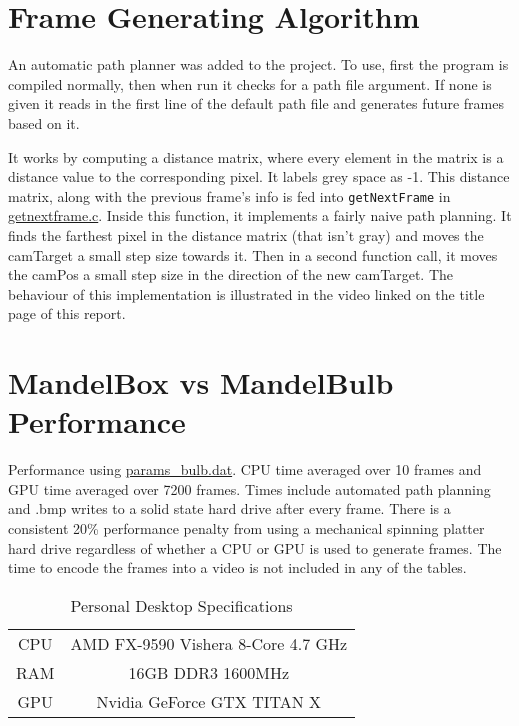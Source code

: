 \documentclass[]{article}
\begin{document}
\section{Frame Generating Algorithm}
An automatic path planner was added to the project. To use, first the program is compiled normally, then when run it checks for a path file argument. If none is given it reads in the first line of the default path file and generates future frames based on it. 

It works by computing a distance matrix, where every element in the matrix is a distance value to the corresponding pixel. It labels grey space as -1. This distance matrix, along with the previous frame's info is fed into \texttt{getNextFrame} in \hyperref[subsec:getnextframe.c]{getnextframe.c}. Inside this function, it implements a fairly naive path planning. It finds the farthest pixel in the distance matrix (that isn't gray) and moves the camTarget a small step size towards it. Then in a second function call, it moves the camPos a small step size in the direction of the new camTarget. The behaviour of this implementation is illustrated in the video linked on the title page of this report.

\section{MandelBox vs MandelBulb Performance }
Performance using \hyperref[subsec:params_bulb]{params\_bulb.dat}. CPU time averaged over 10 frames and GPU time averaged over 7200 frames. Times include automated path planning and .bmp writes to a solid state hard drive after every frame. There is a consistent 20\% performance penalty from using a mechanical spinning platter hard drive regardless of whether a CPU or GPU is used to generate frames. The time to encode the frames into a video is not included in any of the tables.

\vspace{0.125cm}

\begin{table}[h!]
\centering
\label{tab:dd_spec}
\begin{tabular}{c|c}
CPU & AMD FX-9590 Vishera 8-Core 4.7 GHz\\
RAM & 16GB DDR3 1600MHz\\
GPU & Nvidia GeForce GTX TITAN X\\
\end{tabular}
\caption{Personal Desktop Specifications}
\end{table}
\end{document}
